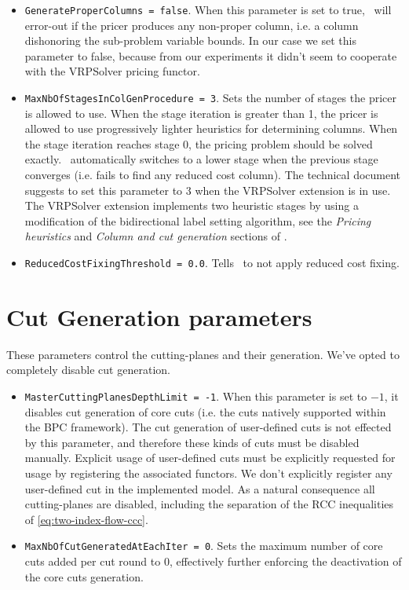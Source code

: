 \begin{itemize}
	\item \texttt{GenerateProperColumns = false}.
	      When this parameter is set to true, \bapcod\ will error-out if the pricer produces any non-proper column,
	      i.e. a column dishonoring the sub-problem variable bounds.
	      In our case we set this parameter to false,
	      because from our experiments it didn't seem to cooperate with the VRPSolver pricing functor.
	\item \texttt{MaxNbOfStagesInColGenProcedure = 3}.
	      Sets the number of stages the pricer is allowed to use.
	      When the stage iteration is greater than 1, the pricer is allowed to use
	      progressively lighter heuristics for determining columns.
	      When the stage iteration reaches stage 0, the pricing problem should be solved exactly.
	      \bapcod\ automatically switches to a lower stage when the previous stage converges (i.e. fails to find any reduced cost column).
	      The technical document suggests to set this parameter to $3$ when the VRPSolver extension is in use.
	      The VRPSolver extension implements two heuristic stages by using a modification of the bidirectional label setting algorithm,
	      see the \textit{Pricing heuristics} and \textit{Column and cut generation} sections of \textcite{sadykov2021a}.
	\item \texttt{ReducedCostFixingThreshold = 0.0}.
	      Tells \bapcod\ to not apply reduced cost fixing.
\end{itemize}

\section{Cut Generation parameters}
These parameters control the cutting-planes and their generation.
We've opted to completely disable cut generation.

\begin{itemize}
	\item \texttt{MasterCuttingPlanesDepthLimit = -1}.
	      When this parameter is set to $-1$, it disables cut generation of core cuts
	      (i.e. the cuts natively supported within the BPC framework).
	      The cut generation of user-defined cuts
	      is not effected by this parameter, and therefore these kinds of cuts must be disabled manually.
	      Explicit usage of user-defined cuts must be explicitly requested for usage
	      by registering the associated functors.
	      We don't explicitly register any user-defined cut in the implemented model.
	      As a natural consequence all cutting-planes are disabled, including the separation of the RCC inequalities of \cref{eq:two-index-flow-ccc}.
	\item \texttt{MaxNbOfCutGeneratedAtEachIter = 0}.
	      Sets the maximum number of core cuts added per cut round to $0$,
	      effectively further enforcing the deactivation of the core cuts generation.
\end{itemize}

